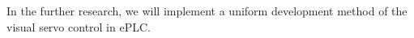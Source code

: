\documentclass[journal,UTF8]{IEEEtran}
\begin{document}
In the further research, we will implement a uniform development method of the visual servo control in ePLC.

\ifCLASSOPTIONcaptionsoff
  \newpage
\fi





%
%
%




%
\end{document}
